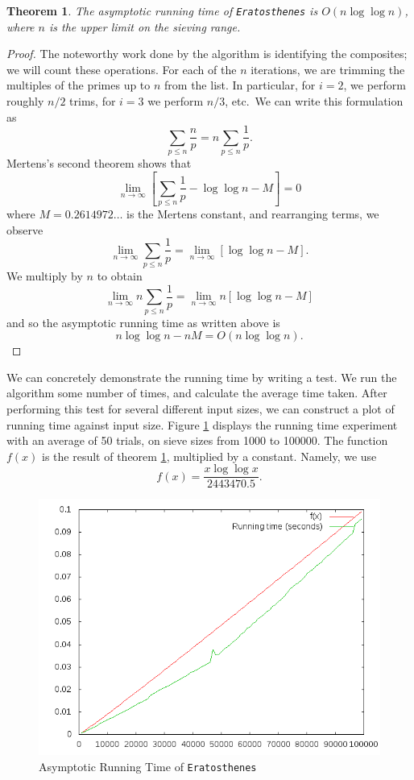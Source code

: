 \documentclass{amsart}
\newtheorem{thm}{Theorem}
\theoremstyle{definition}
\theoremstyle{case}
\begin{document}
	\begin{thm}\label{runtimethm}
		The asymptotic running time of \texttt{Eratosthenes} is $O(n\log\log n)$, where $n$ is the upper limit on the sieving range.
	\end{thm}
	\begin{proof}
		The noteworthy work done by the algorithm is identifying the composites; we will count these operations. For each of the $n$ iterations, we are trimming the multiples of the primes up to $n$ from the list. In particular, for $i=2$, we perform roughly $n/2$ trims, for $i=3$ we perform $n/3$, etc.\ We can write this formulation as
		$$ \sum_{p\leq n} \frac{n}{p} = n \sum_{p \leq n} \frac{1}{p} . $$
		Mertens's second theorem shows that
		$$ \lim\limits_{n\rightarrow\infty} \left[ \sum_{p \leq n} \frac{1}{p} - \log\log n - M \right] = 0 $$
		where $M=0.2614972\dots$ is the Mertens constant, and rearranging terms, we observe
		$$ \lim\limits_{n\rightarrow\infty} \sum_{p \leq n} \frac{1}{p} = \lim\limits_{n\rightarrow\infty} \left[ \log\log n - M \right] . $$
		We multiply by $n$ to obtain
		$$ \lim\limits_{n\rightarrow\infty} n \sum_{p \leq n} \frac{1}{p} = \lim\limits_{n\rightarrow\infty} n \left[ \log\log n - M \right] $$
		and so the asymptotic running time as written above is
		$$ n \log \log n - nM = O(n\log\log n). $$
	\end{proof}
	
	We can concretely demonstrate the running time by writing a test. We run the algorithm some number of times, and calculate the average time taken. After performing this test for several different input sizes, we can construct a plot of running time against input size. Figure \ref{runtime1} displays the running time experiment with an average of 50 trials, on sieve sizes from 1000 to 100000. The function $f(x)$ is the result of theorem \ref{runtimethm}, multiplied by a constant. Namely, we use
	$$ f(x) = \frac{x \log \log x}{2443470.5} . $$
	
	\begin{figure}\caption{Asymptotic Running Time of \texttt{Eratosthenes}}
		\label{runtime1}
		\includegraphics[scale=0.5]{erat3.png}
	\end{figure}
	
\end{document}
